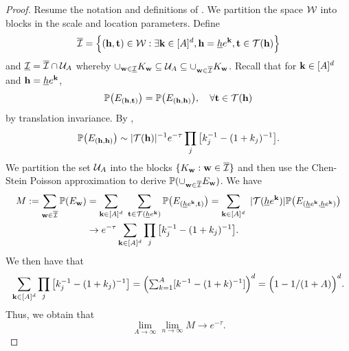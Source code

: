 \documentclass[twoside,11pt]{article}
\begin{document}
\begin{proof}
Resume the notation and definitions of .
We partition the space $\mathcal{W}$ into blocks in the scale and location parameters.
Define %
\[
\overline {\mathcal{I}} = \Big\{ (\mathbf{h},\mathbf{t}) \in \mathcal{W} : \exists \mathbf{k} \in [A]^d, \mathbf{h} = \underline h e^{\mathbf{k}}, \mathbf{t} \in {\mathcal{T}}(\mathbf{h}) \Big\}
\]
and $\underline {\mathcal{I}} = \overline {\mathcal{I}} \cap \mathcal{U}_A$
whereby $\cup_{\mathbf{w} \in \underline {\mathcal{I}}} K_{\mathbf{w}} \subseteq \mathcal{U}_A \subseteq \cup_{\mathbf{w} \in \overline {\mathcal{I}}} K_{\mathbf{w}}$.
Recall that for $\mathbf{k} \in [A]^d$ and $\mathbf{h} = \underline h e^{\mathbf{k}}$,
\[
\mathbb{P} \big( E_{(\mathbf{h},\mathbf{t})}\big) = \mathbb{P} \big( E_{(\mathbf{h},\mathbf{h})}\big), \quad \forall \mathbf{t} \in {\mathcal{T}}(\mathbf{h})
\]
by translation invariance.
By ,
\[
\mathbb{P} \big( E_{(\mathbf{h},\mathbf{h})}\big) \sim |{\mathcal{T}}(\mathbf{h})|^{-1} e^{-\tau} \prod_j \big[k_j^{-1} - (1+ k_j)^{-1} \big].
\]
We partition the set $\mathcal{U}_A$ into the blocks $\{ K_{\mathbf{w}} : \mathbf{w} \in \overline {\mathcal{I}} \}$ and then use the Chen-Stein Poisson approximation to derive $\mathbb{P}(\cup_{\mathbf{w} \in \overline {\mathcal{I}}} E_{\mathbf{w}})$.
We have
\[\begin{split}
M := \sum_{\wb \in \overline \Ical} \PP ( E_\wb) 
&= \sum_{\kb \in [A]^d} \ \sum_{\tb \in \Tcal(\underline h e^\kb)} \PP \big( E_{(\underline h e^\kb,\tb)}\big) = \sum_{\kb \in [A]^d} \ |\Tcal(\underline h e^\kb)| \PP \big( E_{(\underline h e^\kb,\underline h e^\kb)}\big) \\
&\rightarrow e^{-\tau} \sum_{\kb \in [A]^d} \prod_j \big[ k_j^{-1} - (1 + k_j)^{-1} \big].
\end{split}\] 
We then have that
\[
\sum_{\mathbf{k} \in [A]^d} \prod_j \big[ k_j^{-1} - (1 + k_j)^{-1} \big] = \Big( {\textstyle\sum}_{k = 1}^A [k^{-1} - (1 + k)^{-1}] \Big)^d = \Big( 1 - 1/(1 + A) \Big)^d.
\]
Thus, we obtain that 
\[\lim_{A \rightarrow \infty} \lim_{n \rightarrow \infty} M \rightarrow e^{-\tau}.\]


\end{proof}
\end{document}
